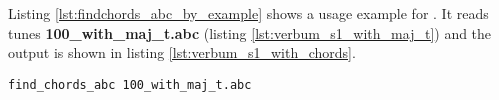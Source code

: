Listing \ref{lst:findchords_abc_by_example} shows a usage example for \findchordsabc{}. It reads
tunes \textbf{100\_with\_maj\_t.abc} (listing \ref{lst:verbum_s1_with_maj_t}) and the output is
shown in listing \ref{lst:verbum_s1_with_chords}.\\

\begin{lstlisting}[caption={\findchordsabc{} by example},label={lst:findchords_abc_by_example},captionpos=t,abovecaptionskip=-\medskipamount]
find_chords_abc 100_with_maj_t.abc
\end{lstlisting}

\begin{center}
  \begin{minipage}{.49\textwidth}
    
  \end{minipage}
  \hfill
  \begin{minipage}{.49\textwidth}
    
  \end{minipage}
\end{center}
